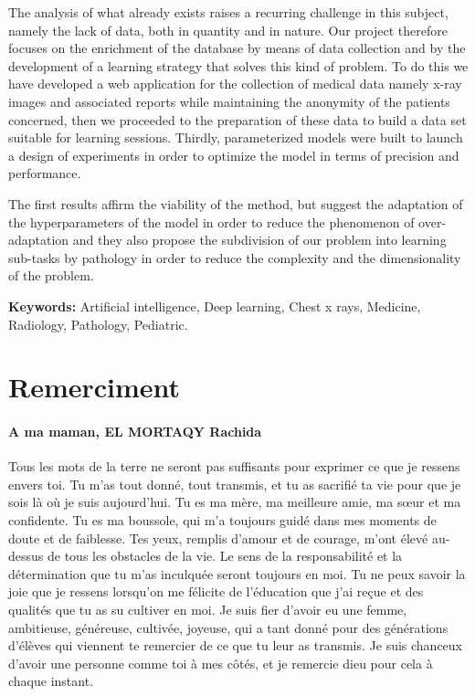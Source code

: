 \documentclass[12pt]{report}
\begin{document}
    The analysis of what already exists raises a recurring challenge in this subject, namely the lack of data, both in quantity and in nature. Our project therefore focuses on the enrichment of the database by means of data collection and by the development of a learning strategy that solves this kind of problem. 
    To do this we have developed a web application for the collection of medical data namely x-ray images and associated reports while maintaining the anonymity of the patients concerned, then we proceeded to the preparation of these data to build a data set suitable for learning sessions. 
    Thirdly, parameterized models were built to launch a design of experiments in order to optimize the model in terms of precision and performance. 
    
    The first results affirm the viability of the method, but suggest the adaptation of the hyperparameters of the model in order to reduce the phenomenon of over-adaptation and they also propose the subdivision of our problem into learning sub-tasks by pathology in order to reduce the complexity and the dimensionality of the problem.


    \vspace*{2cm}
    \textbf{Keywords:} Artificial intelligence, Deep learning, Chest x rays, Medicine, Radiology, Pathology, Pediatric.

    \chapter*{\centering Remerciment}
    \centering
        \subsubsection*{A ma maman, EL MORTAQY Rachida}
        Tous les mots de la terre ne seront pas suffisants pour exprimer ce que je ressens envers toi. Tu m’as tout donné, tout transmis, et tu as sacrifié ta vie pour que je sois là où je suis aujourd’hui. Tu es ma mère, ma meilleure amie, ma sœur et ma confidente. Tu es ma boussole, qui m’a toujours guidé dans mes moments de doute et de faiblesse. Tes yeux, remplis d’amour et de courage, m’ont élevé au-dessus de tous les obstacles de la vie. Le sens de la responsabilité et la détermination que tu m’as inculquée seront toujours en moi. Tu ne peux savoir la joie que je ressens lorsqu’on me félicite de l’éducation que j’ai reçue et des qualités que tu as su cultiver en moi. Je suis fier d’avoir eu une femme, ambitieuse, généreuse, cultivée, joyeuse, qui a tant donné pour des générations d’élèves qui viennent te remercier de ce que tu leur as transmis. Je suis chanceux d’avoir une personne comme toi à mes côtés, et je remercie dieu pour cela à chaque instant.
\end{document}
